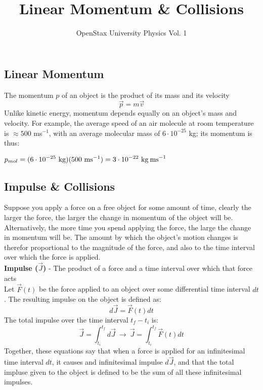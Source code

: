 \documentclass[a4paper]{article}
\date{}
\title{Linear Momentum \& Collisions}
\author{OpenStax University Physics Vol. 1}
\let\bf\textbf
\begin{document}
\setcounter{section}{9}
\maketitle
\subsection{Linear Momentum}
The momentum $p$ of an object is the product of its mass and its velocity
\begin{equation}
    \displaystyle \vec{p} = m\vec{v}
\end{equation}
Unlike kinetic energy, momentum depends equally on an object's mass and velocity. For example, the average speed of an air molecule at room temperature is $\approx 500$ ms$^{-1}$, with an average molecular mass of $6 \cdot 10^{-25}$ kg; its momentum is thus:
\begin{center}
    $\displaystyle p_{mol} = (6\cdot 10^{-25}\text{ kg})(500\text{ ms}^{-1}) = 3 \cdot 10^{-22} \text{ kg\:ms}^{-1}$
\end{center}

\subsection{Impulse \& Collisions}
Suppose you apply a force on a free object for some amount of time, clearly the larger the force, the larger the change in momentum of the object will be. Alternatively, the more time you spend applying the force, the large the change in momentum will be. The amount by which the object's motion changes is therefor proportional to the magnitude of the force, and also to the time interval over which the force is applied.
\vspace{2mm}\\
\bf{Impulse ($\vec{J}$)} - The product of a force and a time interval over which that force acts
\vspace{1mm}\\
Let $\vec{F}(t)$ be the force applied to an object over some differential time interval $dt$. The resulting impulse on the object is defined as:
\begin{equation}
    d\vec{J} = \vec{F}(t)dt
\end{equation}
The total impulse over the time interval $t_f - t_i$ is:
\begin{equation}
    \vec{J} = \int_{t_i}^{t_f}d\vec{J} \ \boldsymbol{\to} \ \vec{J} = \int_{t_i}^{t_f}\vec{F}(t)dt
\end{equation}
Together, these equations say that when a force is applied for an infinitesimal time interval $dt$, it causes and infinitesimal impulse $d\vec{J}$, and that the total impluse given to the object is defined to be the sum of all these infinitesimal impulses.
\end{document}
